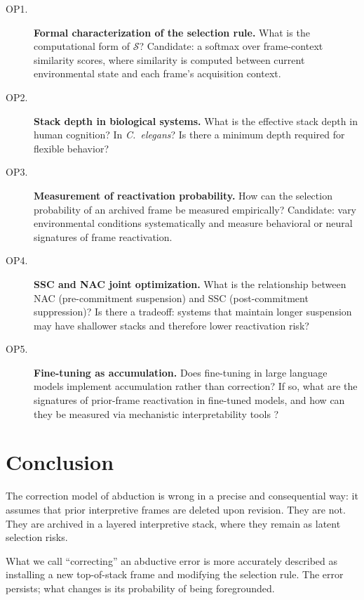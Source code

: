 \documentclass[12pt]{article}
\begin{document}
\begin{description}
  \item[OP1.] \textbf{Formal characterization of the selection rule.}
    What is the computational form of $\mathcal{S}$?
    Candidate: a softmax over frame-context similarity scores,
    where similarity is computed between current environmental
    state and each frame's acquisition context.

  \item[OP2.] \textbf{Stack depth in biological systems.}
    What is the effective stack depth in human cognition?
    In \textit{C.~elegans}?
    Is there a minimum depth required for flexible behavior?

  \item[OP3.] \textbf{Measurement of reactivation probability.}
    How can the selection probability of an archived frame be
    measured empirically?
    Candidate: vary environmental conditions systematically and
    measure behavioral or neural signatures of frame reactivation.

  \item[OP4.] \textbf{SSC and NAC joint optimization.}
    What is the relationship between NAC (pre-commitment suspension)
    and SSC (post-commitment suppression)?
    Is there a tradeoff: systems that maintain longer suspension
    may have shallower stacks and therefore lower reactivation risk?

  \item[OP5.] \textbf{Fine-tuning as accumulation.}
    Does fine-tuning in large language models implement accumulation
    rather than correction?
    If so, what are the signatures of prior-frame reactivation
    in fine-tuned models, and how can they be measured via
    mechanistic interpretability tools \cite{anthropic2025circuit}?
\end{description}

\section{Conclusion}

The correction model of abduction is wrong in a precise and
consequential way: it assumes that prior interpretive frames
are deleted upon revision.
They are not.
They are archived in a layered interpretive stack, where they
remain as latent selection risks.

What we call ``correcting'' an abductive error is more accurately
described as installing a new top-of-stack frame and modifying
the selection rule.
The error persists; what changes is its probability of being
foregrounded.
\end{document}
